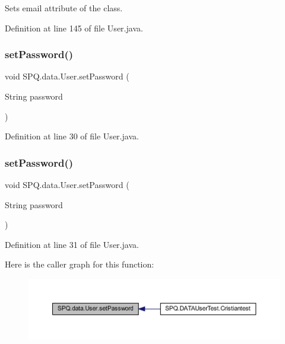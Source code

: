 Sets email attribute of the class. 

Definition at line 145 of file User.\+java.

\mbox{\label{class_s_p_q_1_1data_1_1_user_aa5bcf362d3c9c4746f406239bcb041f5}} 
\subsubsection{\texorpdfstring{set\+Password()}{setPassword()}\hspace{0.1cm}{\footnotesize\ttfamily [1/4]}}
{\footnotesize\ttfamily void S\+P\+Q.\+data.\+User.\+set\+Password (\begin{DoxyParamCaption}\item[{String}]{password }\end{DoxyParamCaption})}



Definition at line 30 of file User.\+java.

\mbox{\label{class_s_p_q_1_1data_1_1_user_aa5bcf362d3c9c4746f406239bcb041f5}} 
\subsubsection{\texorpdfstring{set\+Password()}{setPassword()}\hspace{0.1cm}{\footnotesize\ttfamily [2/4]}}
{\footnotesize\ttfamily void S\+P\+Q.\+data.\+User.\+set\+Password (\begin{DoxyParamCaption}\item[{String}]{password }\end{DoxyParamCaption})}



Definition at line 31 of file User.\+java.

Here is the caller graph for this function\+:\nopagebreak
\begin{figure}[H]
\begin{center}
\leavevmode
\includegraphics[width=350pt]{class_s_p_q_1_1data_1_1_user_aa5bcf362d3c9c4746f406239bcb041f5_icgraph}
\end{center}
\end{figure}
\mbox{\label{class_s_p_q_1_1data_1_1_user_aa5bcf362d3c9c4746f406239bcb041f5}} 
